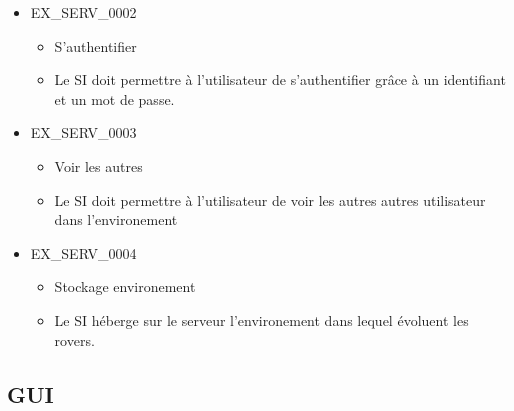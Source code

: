 \documentclass[12pt,a4paper]{scrartcl}
\begin{document}
\begin{itemize}

\item EX\_SERV\_0002
\begin{itemize}
\item S'authentifier
\item Le SI doit permettre à l'utilisateur de s'authentifier grâce à un
		identifiant et un mot de passe.
\end{itemize}


\item EX\_SERV\_0003
\begin{itemize}
\item Voir les autres
\item Le SI doit permettre à l'utilisateur de voir les autres autres 
	utilisateur dans l'environement
\end{itemize}

\item EX\_SERV\_0004
\begin{itemize}
\item Stockage environement
\item Le SI héberge sur le serveur l'environement dans lequel évoluent les 
	rovers.
\end{itemize}


\end{itemize}

\subsection{GUI}
\end{document}
